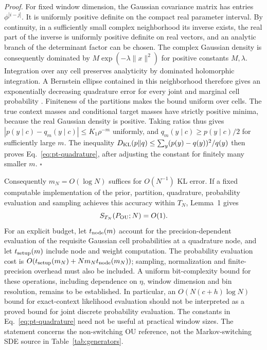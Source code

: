 \documentclass[10pt,a4paper]{article}
\theoremstyle{definition}
\begin{document}
\emph{Proof.}
For fixed window dimension, the Gaussian covariance matrix has entries
$\phi^{|i-j|}$. It is uniformly positive definite on the compact
real parameter interval. By continuity, in a sufficiently small
complex neighborhood its inverse exists, the real part of the inverse
is uniformly positive definite on real vectors, and an analytic branch
of the determinant factor can be chosen. The complex Gaussian density
is consequently dominated by $M\exp(-\lambda\|x\|^2)$ for positive
constants $M,\lambda$. Integration over any cell preserves analyticity
by dominated holomorphic integration. A Bernstein ellipse contained
in this neighborhood therefore gives an exponentially decreasing
quadrature error for every joint and marginal cell probability
\cite{trefethen2019}. Finiteness of the partitions makes the bound
uniform over cells. The true context masses and conditional target
masses have strictly positive minima, because the real Gaussian
density is positive. Taking ratios thus gives
$|p(y\mid c)-q_m(y\mid c)|\leq K_1\rho^{-m}$ uniformly,
and $q_m(y\mid c)\geq p(y\mid c)/2$ for sufficiently large $m$.
The inequality
$D_{\rm KL}(p\Vert q)\leq\sum_y(p(y)-q(y))^2/q(y)$
then proves Eq.~\eqref{eq:pt-quadrature}, after adjusting the constant
for finitely many smaller $m$. \hfill$\square$

Consequently $m_N=O(\log N)$ suffices for $O(N^{-1})$ KL error.
If a fixed computable implementation of the prior, partition,
quadrature, probability evaluation and sampling achieves this accuracy
within $T_N$, Lemma~1 gives
\begin{equation}
 S_{T_N}(P_{\rm OU};N)=O(1).
 \label{eq:pt-ou-bounded}
\end{equation}
For an explicit budget, let $t_{\rm node}(m)$ account for the
precision-dependent evaluation of the requisite Gaussian cell
probabilities at a quadrature node, and let $t_{\rm setup}(m)$ include
node and weight computation. The probability evaluation cost is
$O(t_{\rm setup}(m_N)+Nm_Nt_{\rm node}(m_N))$; sampling,
normalization and finite-precision overhead must also be included.
A uniform bit-complexity bound for these operations, including
dependence on $\eta$, window dimension and bin resolution, remains
to be established. In particular, an $O(N(c+h)\log N)$ bound for
exact-context likelihood evaluation should not be interpreted as a
proved bound for joint discrete probability evaluation. The constants
in Eq.~\eqref{eq:pt-quadrature} need not be useful at practical
window sizes. The statement concerns the non-switching OU reference,
not the Markov-switching SDE source in Table~\ref{tab:generators}.
\end{document}
